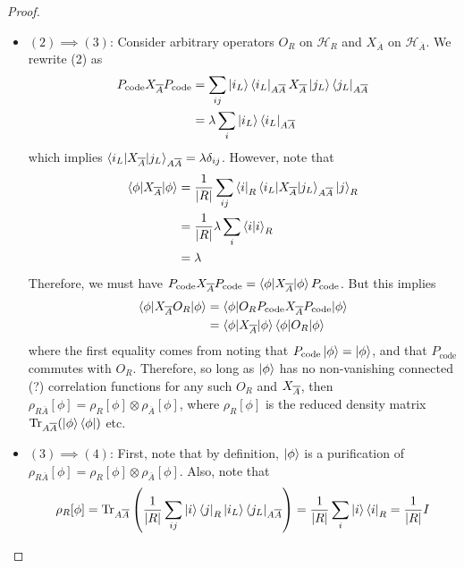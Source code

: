 \documentclass[12pt,a4paper]{article}
\numberwithin{equation}{section}
\newcommand{\ketbra}[2]{\ket{#1}\bra{#2}}
\newcommand{\ketbras}[1]{\ketbra{#1}{#1}}
\newcommand{\Pc}{P_{\text{code}}}
\begin{document}
\begin{itemize}
\begin{proof}
\begin{itemize}
				\item $(2)\implies (3)$: Consider arbitrary operators $O_{R}$ on $\mathcal{H}_{R}$ and $X_{\overline{A}}$ on $\mathcal{H}_{\overline{A}}$. We rewrite (2) as
				\begin{equation}
					\begin{aligned}
						\Pc\Xabar\Pc&=\sum_{ij}\ketbras{i_{L}}_{A\overline{A}}\Xabar\ketbras{j_{L}}_{A\overline{A}}\\&=\lambda\sum_{i}\ketbras{i_{L}}_{A\overline{A}}
					\end{aligned}
				\end{equation}
				which implies $\braket{i_{L}|X_{\overline{A}}|j_{L}}_{A\overline{A}}=\lambda\delta_{ij}$. However, note that
				\begin{equation}
					\begin{aligned}
						\braket{\phi|X_{\overline{A}}|\phi}&=\frac{1}{|R|}\sum_{ij}\bra{i}_{R}\braket{i_{L}|X_{\overline{A}}|j_{L}}_{A\overline{A}}\ket{j}_{R}\\&=\frac{1}{|R|}\lambda\sum_{i}\braket{i|i}_{R}\\&=\lambda
					\end{aligned}
				\end{equation}
				Therefore, we must have $\Pc\Xabar\Pc=\braket{\phi|\Xabar|\phi}\Pc$. But this implies
				\begin{equation}
					\begin{aligned}
						\braket{\phi|\Xabar O_{R}|\phi}&=\braket{\phi|O_{R}\Pc\Xabar\Pc|\phi}\\&=\braket{\phi|\Xabar|\phi}\braket{\phi|O_{R}|\phi}
					\end{aligned}
				\end{equation}
				where the first equality comes from noting that $\Pc\ket{\phi}=\ket{\phi}$, and that $\Pc$ commutes with $O_{R}$. Therefore, so long as $\ket{\phi}$ has no non-vanishing connected (?) correlation functions for any such $O_{R}$ and $X_{\overline{A}}$, then $\rho_{R\overline{A}}[\phi]=\rho_{R}[\phi]\otimes\rho_{\overline{A}}[\phi]$, where $\rho_{R}[\phi]$ is the reduced density matrix $\text{Tr}_{A\overline{A}}(\ketbras{\phi})$ etc.
				\item $(3)\implies (4)$: First, note that by definition, $\ket{\phi}$ is a purification of $\rho_{R\overline{A}}[\phi]=\rho_{R}[\phi]\otimes\rho_{\overline{A}}[\phi]$. Also, note that
				\begin{equation}
					\rho_{R}[\phi]=\text{Tr}_{A\overline{A}}\left(\frac{1}{|R|}\sum_{ij}\ketbra{i}{j}_{R}\ketbra{i_{L}}{j_{L}}_{A\overline{A}}\right)=\frac{1}{|R|}\sum_{i}\ketbras{i}_{R}=\frac{1}{|R|}I

\end{equation}
\end{itemize}
\end{proof}
\end{itemize}
\end{document}

